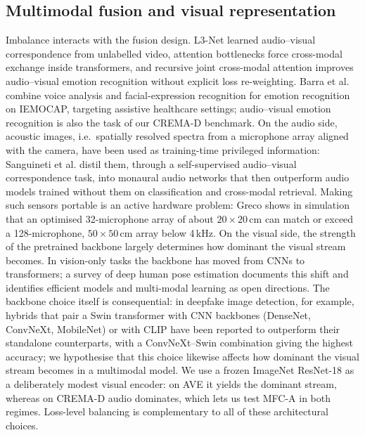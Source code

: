 \documentclass[fleqn,10pt]{wlscirep}
\begin{document}
\subsection*{Multimodal fusion and visual representation}
Imbalance interacts with the fusion design. L3-Net\cite{arandjelovic2017look} learned audio--visual correspondence from unlabelled video, attention bottlenecks\cite{nagrani2021attention} force cross-modal exchange inside transformers, and recursive joint cross-modal attention\cite{praveen2024recursive} improves audio--visual emotion recognition without explicit loss re-weighting. Barra et al.\cite{barra2023multimodal} combine voice analysis and facial-expression recognition for emotion recognition on IEMOCAP, targeting assistive healthcare settings; audio--visual emotion recognition is also the task of our CREMA-D benchmark. On the audio side, acoustic images, i.e.\ spatially resolved spectra from a microphone array aligned with the camera, have been used as training-time privileged information: Sanguineti et al.\cite{sanguineti2020leveraging} distil them, through a self-supervised audio--visual correspondence task, into monaural audio networks that then outperform audio models trained without them on classification and cross-modal retrieval. Making such sensors portable is an active hardware problem: Greco\cite{greco2023feasibility} shows in simulation that an optimised 32-microphone array of about $20{\times}20$\,cm can match or exceed a 128-microphone, $50{\times}50$\,cm array below 4\,kHz. On the visual side, the strength of the pretrained backbone largely determines how dominant the visual stream becomes. In vision-only tasks the backbone has moved from CNNs to transformers; a survey of deep human pose estimation\cite{lan2023pose} documents this shift and identifies efficient models and multi-modal learning as open directions. The backbone choice itself is consequential: in deepfake image detection, for example, hybrids that pair a Swin transformer with CNN backbones (DenseNet, ConvNeXt, MobileNet) or with CLIP have been reported to outperform their standalone counterparts, with a ConvNeXt--Swin combination giving the highest accuracy\cite{mishra2026deepfake}; we hypothesise that this choice likewise affects how dominant the visual stream becomes in a multimodal model. We use a frozen ImageNet ResNet-18\cite{he2016deep} as a deliberately modest visual encoder: on AVE it yields the dominant stream, whereas on CREMA-D audio dominates, which lets us test MFC-A in both regimes. Loss-level balancing is complementary to all of these architectural choices.
\end{document}
